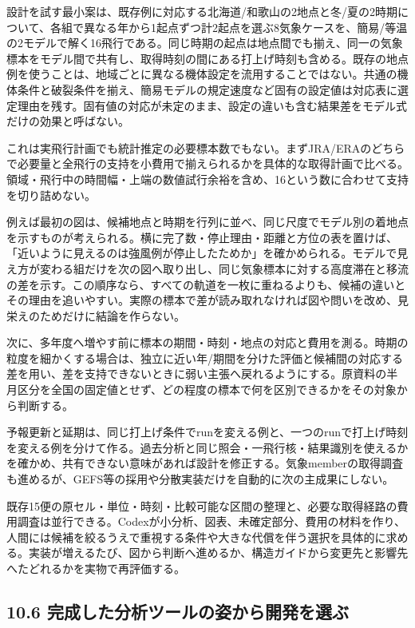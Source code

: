 \documentclass[11pt,a4paper]{article}
\begin{document}
設計を試す最小案は、既存例に対応する北海道/和歌山の2地点と冬/夏の2時期について、各組で異なる年から1起点ずつ計2起点を選ぶ8気象ケースを、簡易/等温の2モデルで解く16飛行である。同じ時期の起点は地点間でも揃え、同一の気象標本をモデル間で共有し、取得時刻の間にある打上げ時刻も含める。既存の地点例を使うことは、地域ごとに異なる機体設定を流用することではない。共通の機体条件と破裂条件を揃え、簡易モデルの規定速度など固有の設定値は対応表に選定理由を残す。固有値の対応が未定のまま、設定の違いも含む結果差をモデル式だけの効果と呼ばない。

これは実飛行計画でも統計推定の必要標本数でもない。まずJRA/ERAのどちらで必要量と全飛行の支持を小費用で揃えられるかを具体的な取得計画で比べる。領域・飛行中の時間幅・上端の数値試行余裕を含め、16という数に合わせて支持を切り詰めない。

例えば最初の図は、候補地点と時期を行列に並べ、同じ尺度でモデル別の着地点を示すものが考えられる。横に完了数・停止理由・距離と方位の表を置けば、「近いように見えるのは強風例が停止したためか」を確かめられる。モデルで見え方が変わる組だけを次の図へ取り出し、同じ気象標本に対する高度滞在と移流の差を示す。この順序なら、すべての軌道を一枚に重ねるよりも、候補の違いとその理由を追いやすい。実際の標本で差が読み取れなければ図や問いを改め、見栄えのためだけに結論を作らない。

次に、多年度へ増やす前に標本の期間・時刻・地点の対応と費用を測る。時期の粒度を細かくする場合は、独立に近い年/期間を分けた評価と候補間の対応する差を用い、差を支持できないときに弱い主張へ戻れるようにする。原資料の半月区分を全国の固定値とせず、どの程度の標本で何を区別できるかをその対象から判断する。

予報更新と延期は、同じ打上げ条件でrunを変える例と、一つのrunで打上げ時刻を変える例を分けて作る。過去分析と同じ照会・一飛行核・結果識別を使えるかを確かめ、共有できない意味があれば設計を修正する。気象memberの取得調査も進めるが、GEFS等の採用や分散実装だけを自動的に次の主成果にしない。

既存15便の原セル・単位・時刻・比較可能な区間の整理と、必要な取得経路の費用調査は並行できる。Codexが小分析、図表、未確定部分、費用の材料を作り、人間には候補を絞るうえで重視する条件や大きな代償を伴う選択を具体的に求める。実装が増えるたび、図から判断へ進めるか、構造ガイドから変更先と影響先へたどれるかを実物で再評価する。

\subsection{10.6
完成した分析ツールの姿から開発を選ぶ}\label{ux5b8cux6210ux3057ux305fux5206ux6790ux30c4ux30fcux30ebux306eux59ffux304bux3089ux958bux767aux3092ux9078ux3076}
\end{document}
